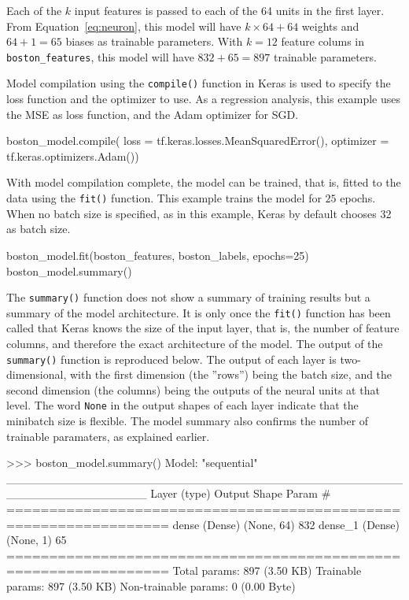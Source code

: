 Each of the $k$ input features is passed to each of the 64 units in the first layer. From Equation~\ref{eq:neuron}, this model will have $k \times 64 + 64$ weights and $64 + 1 = 65$ biases as trainable parameters. With $k=12$ feature colums in \texttt{boston\_features}, this model will have $832 + 65 = 897$ trainable parameters. 

Model compilation using the \texttt{compile()} function in Keras is used to specify the loss function and the optimizer to use. As a regression analysis, this example uses the MSE as loss function, and the Adam optimizer for SGD.

\begin{samepage}
\begin{pythoncode}
boston_model.compile(
    loss = tf.keras.losses.MeanSquaredError(),
    optimizer = tf.keras.optimizers.Adam())
\end{pythoncode}
\end{samepage}

With model compilation complete, the model can be trained, that is, fitted to the data using the \texttt{fit()} function. This example trains the model for $25$ epochs. When no batch size is specified, as in this example, Keras by default chooses 32 as batch size.

\begin{samepage}
\begin{pythoncode}
boston_model.fit(boston_features, boston_labels, epochs=25)
boston_model.summary()
\end{pythoncode}
\end{samepage}

The \texttt{summary()} function does not show a summary of training results but a summary of the model architecture. It is only once the \texttt{fit()} function has been called that Keras knows the size of the input layer, that is, the number of feature columns, and therefore the exact architecture of the model. The output of the \texttt{summary()} function is reproduced below. The output of each layer is two-dimensional, with the first dimension (the ''rows'') being the batch size, and the second dimension (the columns) being the outputs of the neural units at that level. The word \texttt{None} in the output shapes of each layer indicate that the minibatch size is flexible. The model summary also confirms the number of trainable paramaters, as explained earlier.

\begin{samepage}
\begin{textcode}
>>> boston_model.summary()
Model: "sequential"
_________________________________________________________________
 Layer (type)                Output Shape              Param #   
=================================================================
 dense (Dense)               (None, 64)                832       
 dense_1 (Dense)             (None, 1)                 65        
=================================================================
Total params: 897 (3.50 KB)
Trainable params: 897 (3.50 KB)
Non-trainable params: 0 (0.00 Byte)
\end{textcode}
\end{samepage}

